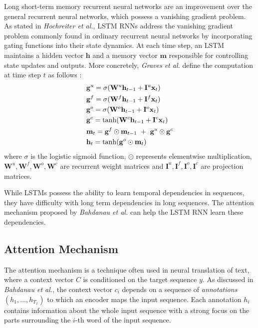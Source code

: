\documentclass[article]{IEEEtran}
\begin{document}
Long short-term memory recurrent neural networks are an improvement over the general recurrent neural networks, which possess a vanishing gradient problem. As stated in \textit{Hochreiter et al.}\cite{hochreiter1997long}, LSTM RNNs address the vanishing gradient problem commonly found in ordinary recurrent neural networks by incorporating gating functions into their state dynamics. At each time step, an LSTM maintains a hidden vector $\mathbf h$ and a memory vector $\mathbf m$  responsible for controlling state updates and outputs. More concretely, \textit{Graves et al.} \cite{graves2012supervised} define the computation at time step $t$ as follows :
\begin{equation}
	\begin{split}
		& \mathbf g^u = \sigma(\mathbf W^u\mathbf h_{t-1}  + \mathbf I^u{\mathbf x}_t ) \\
		& \mathbf g^f = \sigma(\mathbf W^f\mathbf h_{t-1} + \mathbf I^f{\mathbf x}_t) \\
		& \mathbf g^o = \sigma(\mathbf W^o\mathbf h_{t-1} + \mathbf I^o{\mathbf x}_t) \\
		& \mathbf g^c = \tanh(\mathbf W^c\mathbf h_{t-1} + \mathbf I^c{\mathbf x}_t) \\
		& \mathbf m_t = \mathbf g^f \odot \mathbf m_{t-1}\mathbf \ + \  \mathbf g^u \odot 
		\mathbf g^c \\
		& \mathbf h_t = \tanh(\mathbf g^o \odot \mathbf m_t) 
	\end{split}
\end{equation}
where $\sigma$ is the logistic sigmoid function, $\odot$ represents elementwise multiplication, $\mathbf W^u, \mathbf W^f, \mathbf W^o, \mathbf W^c$ are recurrent weight matrices and $\mathbf I^u, \mathbf I^f, \mathbf I^o, \mathbf I^c$ are projection matrices.

While LSTMs possess the ability to learn temporal dependencies in sequences, they have difficulty with long term dependencies in long sequences. The attention mechanism proposed by \textit{Bahdanau et al.} \cite{bahdanau2014neural} can help the LSTM RNN learn these dependencies. 

\subsection{Attention Mechanism}
The attention mechanism is a technique often used in neural translation of text, where a context vector $C$ is conditioned on the target sequence $y$. As discussed in \textit{Bahdanau et al.}\cite{bahdanau2014neural}, the context vector $c_i$ depends on a sequence of \textit{annotations} $(h_1, ..., h_{T_{x}})$ to which an encoder maps the input sequence. Each annotation $h_i$ contains information about the whole input sequence with a strong focus on the parts surrounding the $i$-th word of the input sequence.
\end{document}
